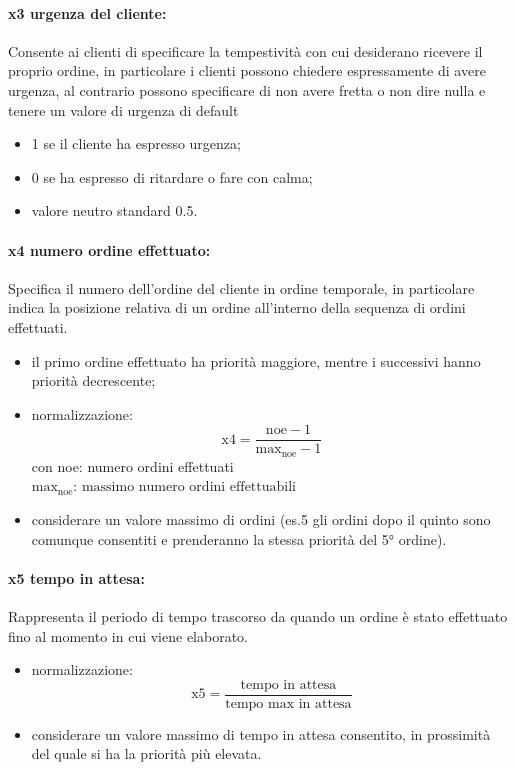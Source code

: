 \paragraph{x3 urgenza del cliente:}
Consente ai clienti di specificare la tempestività con cui desiderano ricevere il proprio ordine, in particolare i clienti possono chiedere espressamente di avere urgenza, al contrario possono specificare di non avere fretta o non dire nulla e tenere un valore di urgenza di default
\begin{itemize}
	\item 1 se il cliente ha espresso urgenza;
	\item 0 se ha espresso di ritardare o fare con calma;
	\item valore neutro standard 0.5.
\end{itemize}

\paragraph{x4 numero ordine effettuato:}
Specifica il numero dell’ordine del cliente in ordine temporale, in particolare indica la posizione relativa di un ordine all'interno della sequenza di ordini effettuati.
\begin{itemize}
	\item il primo ordine effettuato ha priorità maggiore, mentre i successivi hanno priorità decrescente;
	\item normalizzazione: \begin{equation*}
		\text{x4} = \frac{\text{noe} - 1}{\text{max}_{\text{noe}} - 1}
	\end{equation*} con noe: numero ordini effettuati\\
	$\text{max}_{\text{noe}} \text{: massimo numero ordini effettuabili}$
	\item considerare un valore massimo di ordini (es.5 gli ordini dopo il quinto sono comunque consentiti e prenderanno la stessa priorità del 5° ordine).
\end{itemize}

\paragraph{x5 tempo in attesa:}
Rappresenta il periodo di tempo trascorso da quando un ordine è stato effettuato fino al momento in cui viene elaborato.
\begin{itemize}
	\item normalizzazione: \begin{equation*}
		\text{x5} = \frac{\text{tempo in attesa}}{\text{tempo max in attesa}}
	\end{equation*}
	\item considerare un valore massimo di tempo in attesa consentito, in prossimità del quale si ha la priorità più elevata.
\end{itemize}


